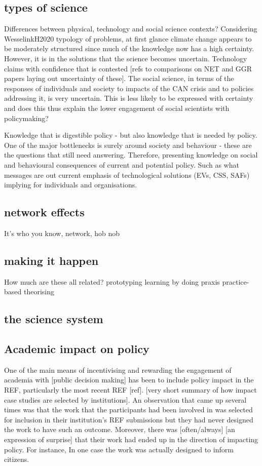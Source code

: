 \subsection{types of science}
Differences between physical, technology and social science contexts?
Considering WesselinkH2020 typology of problems, at first glance climate change appears to be moderately structured since much of the knowledge now has a high certainty. However, it is in the solutions that the science becomes uncertain. Technology claims with confidence that is contested [refs to comparisons on NET and GGR papers laying out uncertainty of these]. The social science, in terms of the responses of individuals and society to impacts of the CAN crisis and to policies addressing it, is very uncertain. This is less likely to be expressed with certainty and does this thus explain the lower engagement of social scientists with policymaking?

Knowledge that is digestible policy - but also knowledge that is needed by policy. One of the major bottlenecks is surely around society and behaviour - these are the questions that still need answering. Therefore, presenting knowledge on social and behavioural consequences of current and potential policy. Such as what messages are out current emphasis of technological solutions (EVs, CSS, SAFs) implying for individuals and organisations.

\subsection{network effects}
It's who you know, network, hob nob

\subsection{making it happen}
How much are these all related?
prototyping
learning by doing
praxis
practice-based theorising

\subsection{the science system}

\subsection{Academic impact on policy}
One of the main means of incentivising and rewarding the engagement of academia with [public decision making] has been to include policy impact in the REF, particularly the most recent REF [ref]. [very short summary of how impact case studies are selected by institutions]. An observation that came up several times was that the work that the participants had been involved in was selected for inclusion in their institution's REF submissions but they had never designed the work to have such an outcome. Moreover, there was [often/always] [an expression of surprise] that their work had ended up in the direction of impacting policy. For instance, In one case the work was actually designed to inform citizens. 

